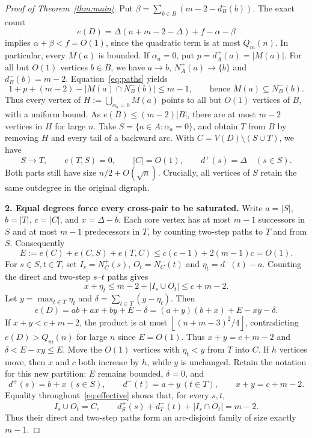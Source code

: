 \documentclass[11pt,a4paper]{amsart}
\newcommand{\fl}[1]{\left\lfloor#1\right\rfloor}
\newcommand{\ar}{\to}
\newcommand{\Q}{Q_m}
\begin{document}
\begin{proof}[Proof of Theorem~\ref{thm:main}]
Put $\beta=\sum_{b\in B}(m-2-d_B^-(b))$. The exact count
\begin{equation}\label{eq:deficit}
 e(D)=\Delta(n+m-2-\Delta)+f-\alpha-\beta
\end{equation}
implies $\alpha+\beta<f=O(1)$, since the quadratic term is at most
$\Q(n)$. In particular, every $M(a)$ is bounded.
If $\alpha_a=0$, put $p=d_A^+(a)=|M(a)|$. For all but $O(1)$
vertices $b\in B$, we have $a\ar b$, $N_A^+(a)\ar\{b\}$ and
$d_B^-(b)=m-2$. Equation~\eqref{eq:paths} yields
\[
 1+p+(m-2)-|M(a)\cap N_B^-(b)|\le m-1,
 \qquad\text{hence }M(a)\subseteq N_B^-(b).
\]
Thus every vertex of $H:=\bigcup_{\alpha_a=0}M(a)$ points to all but
$O(1)$ vertices of $B$, with a uniform bound. As $e(B)\le(m-2)|B|$,
there are at most $m-2$ vertices in $H$ for large $n$.
Take $S=\{a\in A:\alpha_a=0\}$, and obtain $T$ from $B$ by removing
$H$ and every tail of a backward arc. With $C=V(D)\setminus(S\cup T)$,
we have
\begin{equation}\label{eq:partition}
 S\ar T,\qquad e(T,S)=0,\qquad |C|=O(1),\qquad
 d^+(s)=\Delta\quad(s\in S).
\end{equation}
Both parts still have size $n/2+O(\sqrt n)$. Crucially, all vertices
of $S$ retain the same outdegree in the original digraph.

\smallskip\noindent
\textbf{2. Equal degrees force every cross-pair to be saturated.}
Write $a=|S|$, $b=|T|$, $c=|C|$, and $x=\Delta-b$.
Each core vertex has at most $m-1$ successors in $S$ and at most $m-1$
predecessors in $T$, by counting two-step paths to $T$ and from $S$.
Consequently
\[
 E:=e(C)+e(C,S)+e(T,C)\le c(c-1)+2(m-1)c=O(1).
\]
For $s\in S,t\in T$, set $I_s=N_C^+(s)$, $O_t=N_C^-(t)$ and
$\eta_t=d^-(t)-a$. Counting the direct and two-step $s$--$t$ paths gives
\begin{equation}\label{eq:effective}
 x+\eta_t
 \le m-2+|I_s\cup O_t|\le c+m-2.
\end{equation}
Let $y=\max_{t\in T}\eta_t$ and
$\delta=\sum_{t\in T}(y-\eta_t)$. Then
\begin{equation}\label{eq:count}
 e(D)=ab+ax+by+E-\delta
     =(a+y)(b+x)+E-xy-\delta.
\end{equation}
If $x+y<c+m-2$, the product is at most
$\fl{(n+m-3)^2/4}$, contradicting $e(D)>\Q(n)$ for large $n$ since
$E=O(1)$. Thus $x+y=c+m-2$ and $\delta<E-xy\le E$.
Move the $O(1)$ vertices with $\eta_t<y$ from $T$ into $C$.
If $h$ vertices move, then $x$ and $c$ both increase by $h$, while
$y$ is unchanged. Retain the notation for this new partition: $E$
remains bounded, $\delta=0$, and
\begin{equation}\label{eq:uniform}
 d^+(s)=b+x\ (s\in S),\qquad d^-(t)=a+y\ (t\in T),\qquad
 x+y=c+m-2.
\end{equation}
Equality throughout~\eqref{eq:effective} shows that, for every $s,t$,
\begin{equation}\label{eq:saturated}
 I_s\cup O_t=C,\qquad
 d_S^+(s)+d_T^-(t)+|I_s\cap O_t|=m-2.
\end{equation}
Thus their direct and two-step paths form an arc-disjoint family of
size exactly $m-1$.


\end{proof}
\end{document}
